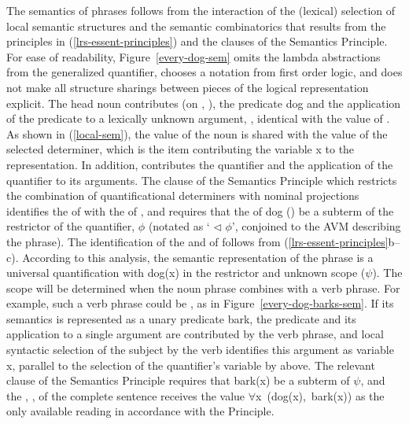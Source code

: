 \documentclass[output=paper
	        ,collection
	        ,collectionchapter
 	        ,biblatex
                ,babelshorthands
                ,newtxmath
                ,draftmode
                ,colorlinks, citecolor=brown
]{langscibook}
\begin{document}
The semantics of phrases follows from the interaction of the (lexical) selection of local semantic structures and the semantic combinatorics that results from the principles in (\ref{lrs-essent-principles}) and the clauses of the Semantics Principle.
For ease of readability, Figure~\ref{every-dog-sem} omits the lambda abstractions from the generalized quantifier, chooses a notation from first order logic, and does not make all structure sharings between pieces of the logical representation explicit. The head noun  contributes (on , ), the predicate {\normalfont \sffamily dog} and the application of the predicate to a lexically unknown argument, , identical with the  value of . As shown in (\ref{local-sem}), the  value of the noun is shared with the  value of the selected determiner, which is the item contributing the variable {\normalfont \sffamily x} to the representation. In addition,  contributes the quantifier and the application of the quantifier to its arguments. The clause of the Semantics Principle which restricts the combination of quantificational determiners with nominal projections identifies the  of  with the  of , and requires that the  of dog () be a subterm of the restrictor of the quantifier, $\phi$ (notated as ` $\triangleleft$ $\phi$', conjoined to the AVM describing the phrase). The identification of the  and  of  follows from (\ref{lrs-essent-principles}b--c). According to this analysis, the semantic representation of the phrase  is a universal quantification with {\normalfont \sffamily dog(x)} in the restrictor and unknown scope ($\psi$). The scope will be determined when the noun phrase combines with a verb phrase. For example, such a verb phrase could be , as in  Figure~\ref{every-dog-barks-sem}. If its semantics is represented as a unary predicate {\normalfont \sffamily bark}, the predicate and its application to a single argument are contributed by the verb phrase, and local syntactic selection of the subject  by the verb  identifies this argument as variable {\normalfont \sffamily x}, parallel to the selection of the quantifier's variable by  above. The relevant clause of the Semantics Principle requires that {\normalfont \sffamily bark(x)} be a subterm of $\psi$, and the , , of the complete sentence receives the value \mbox{\normalfont \sffamily $\forall$x (dog(x), bark(x))} as the only available reading in accordance with the  Principle. %
\end{document}
